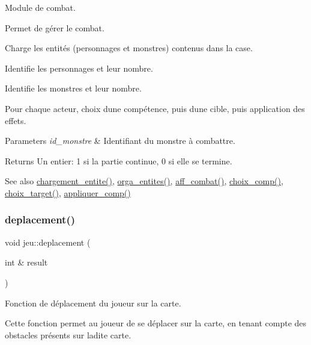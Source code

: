 Module de combat. 

Permet de gérer le combat.
\begin{DoxyItemize}
\item Charge les entités (personnages et monstres) contenus dans la case.
\item Identifie les personnages et leur nombre.
\item Identifie les monstres et leur nombre.
\item Pour chaque acteur, choix d\textquotesingle{}une compétence, puis d\textquotesingle{}une cible, puis application des effets. 
\begin{DoxyParams}{Parameters}
{\em id\+\_\+monstre} & Identifiant du monstre à combattre. \\
\hline
\end{DoxyParams}
\begin{DoxyReturn}{Returns}
Un entier\+: 1 si la partie continue, 0 si elle se termine. 
\end{DoxyReturn}
\begin{DoxySeeAlso}{See also}
\hyperlink{classjeu_a77728b27a5a1f4194ac77c414b983f01}{chargement\+\_\+entite()}, \hyperlink{classjeu_afd7a155c8adcee663d6aeb98b2dae010}{orga\+\_\+entites()}, \hyperlink{namespaceio_aea8dfd5fea1f29722c77b31ef7b0b940}{aff\+\_\+combat()}, \hyperlink{classjeu_a91981b755a6b0895703d9adf537f0ae6}{choix\+\_\+comp()}, \hyperlink{classjeu_ad9ea0cb9e74e6d9b0385720528450f61}{choix\+\_\+target()}, \hyperlink{classjeu_a6bc1f7cfd93bdc33fc9f841ec3f5f80f}{appliquer\+\_\+comp()} 
\end{DoxySeeAlso}

\end{DoxyItemize}\mbox{\label{classjeu_a852b0a8b2d17f0af120c6798861ef806}} 
\subsubsection{\texorpdfstring{deplacement()}{deplacement()}}
{\footnotesize\ttfamily void jeu\+::deplacement (\begin{DoxyParamCaption}\item[{int \&}]{result }\end{DoxyParamCaption})}



Fonction de déplacement du joueur sur la carte. 

Cette fonction permet au joueur de se déplacer sur la carte, en tenant compte des obstacles présents sur ladite carte.

